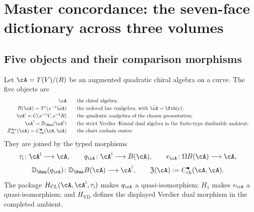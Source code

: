 \chapter{Master concordance: the seven-face dictionary across three volumes}
\label{ch:master-concordance}

\providecommand{\Tr}{\operatorname{Tr}}

\begin{abstract}
The common datum in the seven-face dictionary is the genus-zero
binary collision residue
\[
 r_\cA(z)
 = \operatorname{Res}^{\mathrm{coll}}_{0,2}(\Theta_\cA),
 \qquad
 \Theta_\cA = D_\cA-d_0.
\]
It is the binary component of the twisting morphism
$\theta_\cA\colon B(\cA)\to\cA$.  Bar--cobar inversion recovers
$\cA$; Verdier duality produces $\cA^!$; chiral Hochschild cochains
produce $Z^{\mathrm{der}}_{\mathrm{ch}}(\cA)$.  The tables below record the
normalizations under which the same collision residue appears as
twisting morphism, line-operator twist, Poisson-vertex $r$-matrix,
commuting Hamiltonian seed, Yangian classical limit, Sklyanin tensor,
and Gaudin generator.
\end{abstract}

\section{Five objects and their comparison morphisms}
\label{sec:master-concordance-five-objects}

\begin{convention}
\label{conv:master-five-object-firewall}
Let $\cA=T(V)/(R)$ be an augmented quadratic chiral algebra on a
curve.  The five objects are
\[
\begin{array}{rcl}
\cA && \text{the chiral algebra;}\\[2pt]
B(\cA)=T^c(s^{-1}\bar\cA) && \text{the ordered bar coalgebra,
with }\bar\cA=\fib(\epsilon);\\[2pt]
\cA^{\mathrm i}=C(s^{-1}V,s^{-2}R) && \text{the quadratic
coalgebra of the chosen presentation;}\\[2pt]
\cA^!=\mathbb D_{\Ran}(\cA^{\mathrm i}) && \text{the strict
Verdier--Koszul dual algebra in the finite-type dualizable ambient;}\\[2pt]
Z^{\mathrm{der}}_{\mathrm{ch}}(\cA)
 = C^\bullet_{\mathrm{ch}}(\cA,\cA) && \text{the chart cochain
centre.}
\end{array}
\]
They are joined by the typed morphisms
\[
\tau_{\mathrm i}\colon\cA^{\mathrm i}\longrightarrow\cA,
\qquad
q_\cA\colon\cA^{\mathrm i}\longrightarrow B(\cA),
\qquad
\epsilon_\cA\colon\Omega B(\cA)\longrightarrow\cA,
\]
\[
\mathbb D_{\Ran}(q_\cA)\colon
\mathbb D_{\Ran}B(\cA)\longrightarrow\cA^!,
\qquad
\mathfrak Z(\cA):=C^\bullet_{\mathrm{ch}}(\cA,\cA).
\]
The package
$H_{\mathrm{CL}}(\cA,\cA^{\mathrm i},\tau_{\mathrm i})$ makes
$q_\cA$ a quasi-isomorphism;
$H_1$ makes $\epsilon_\cA$ a quasi-isomorphism; and $H_{\mathrm{VD}}$
defines the displayed Verdier dual morphism in the completed ambient.
\end{convention}

